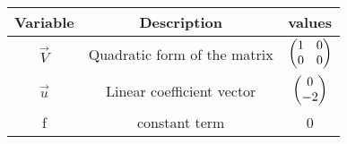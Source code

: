 \begin{tabular}[12pt]{ |c| c| c |}
    \hline
    \textbf{Variable} & \textbf{Description} & \textbf{values}\\ 
    \hline
    $\vec{V}$ & Quadratic form of the matrix & $\begin{pmatrix}1& 0 \\ 0 & 0\end{pmatrix} $\\
    \hline
    $\vec{u}$ & Linear coefficient vector & $\begin{pmatrix}0 \\ -2\end{pmatrix} $\\
    \hline
    f & constant term & 0 \\ 
    \hline
\end{tabular}
